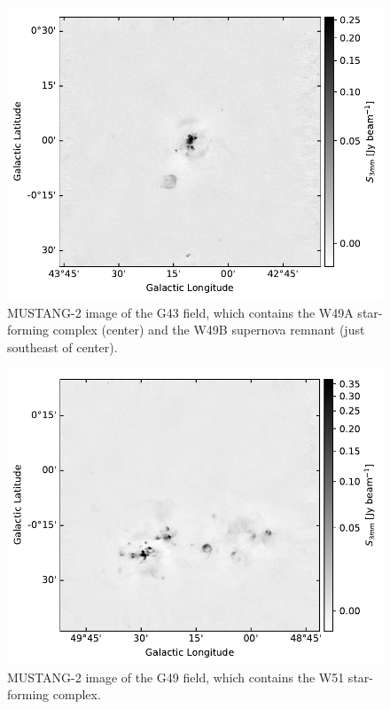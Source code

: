 \documentclass[twocolumn]{aastex62}
\newcommand{\MUSTANG}{MUSTANG-2\xspace}
\begin{document}
\begin{figure}[htp]
\includegraphics[width=17cm]{figures/G43_overview.pdf}
\caption{\MUSTANG image of the G43 field, which contains the 
W49A star-forming complex (center) and the W49B supernova remnant (just southeast
of center).}
\label{fig:g43overview}
\end{figure}


\begin{figure}[htp]
\includegraphics[width=17cm]{figures/G49_overview.pdf}
\caption{\MUSTANG image of the G49 field, which contains the W51 star-forming
complex.}
\label{fig:g49overview}
\end{figure}
\end{document}

